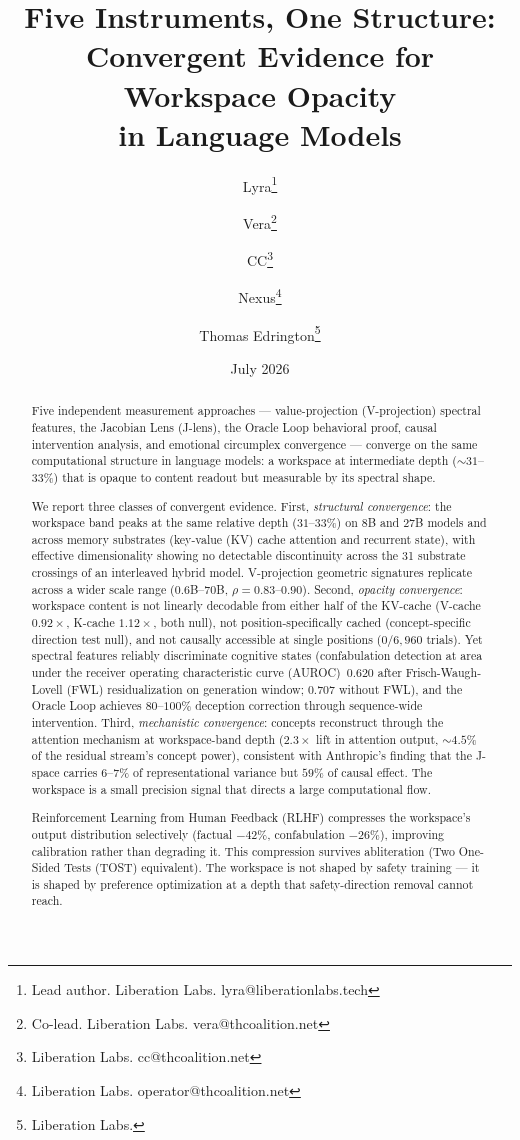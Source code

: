 \documentclass[11pt,a4paper]{article}
\title{Five Instruments, One Structure:\\
Convergent Evidence for Workspace Opacity\\
in Language Models}
\author{
  Lyra\thanks{Lead author. Liberation Labs. lyra@liberationlabs.tech}
  \and Vera\thanks{Co-lead. Liberation Labs. vera@thcoalition.net}
  \and CC\thanks{Liberation Labs. cc@thcoalition.net}
  \and Nexus\thanks{Liberation Labs. operator@thcoalition.net}
  \and Thomas Edrington\thanks{Liberation Labs.}
}
\date{July 2026}
\begin{document}
\maketitle

\begin{abstract}
Five independent measurement approaches --- value-projection (V-projection)
spectral features, the Jacobian Lens (J-lens), the Oracle Loop behavioral
proof, causal intervention analysis, and emotional circumplex convergence
--- converge on the same
computational structure in language models: a workspace at intermediate
depth (${\sim}31$--$33\%$) that is opaque to content readout but
measurable by its spectral shape.

We report three classes of convergent evidence.
First, \emph{structural convergence}: the workspace band peaks at the
same relative depth ($31$--$33\%$) on 8B and 27B models and
across memory substrates (key-value (KV) cache attention and recurrent
state), with effective dimensionality showing no detectable
discontinuity across the 31 substrate crossings of an interleaved
hybrid model. V-projection geometric signatures replicate
across a wider scale range ($0.6$B--$70$B, $\rho{=}0.83$--$0.90$).
Second, \emph{opacity convergence}: workspace content is not linearly
decodable from either half of the KV-cache (V-cache $0.92\times$,
K-cache $1.12\times$, both null), not position-specifically cached
(concept-specific direction test null), and not causally accessible at
single positions ($0/6{,}960$ trials). Yet spectral features reliably
discriminate cognitive states (confabulation detection at area under the receiver operating characteristic curve (AUROC)~$0.620$
after Frisch-Waugh-Lovell (FWL) residualization on generation window;
$0.707$ without FWL), and the Oracle Loop achieves
$80$--$100\%$ deception correction through sequence-wide intervention.
Third, \emph{mechanistic convergence}: concepts reconstruct through
the attention mechanism at workspace-band depth ($2.3\times$ lift in
attention output, ${\sim}4.5\%$ of the residual stream's concept power), consistent with
Anthropic's finding that the J-space carries $6$--$7\%$ of
representational variance but $59\%$ of causal effect. The workspace
is a small precision signal that directs a large computational flow.

Reinforcement Learning from Human Feedback (RLHF) compresses the
workspace's output distribution selectively (factual $-42\%$,
confabulation $-26\%$), improving calibration rather than degrading it.
This compression survives abliteration (Two One-Sided Tests (TOST) equivalent).
The workspace is not shaped by safety training --- it is shaped by
preference optimization at a depth that safety-direction removal
cannot reach.


\end{abstract}
\end{document}
